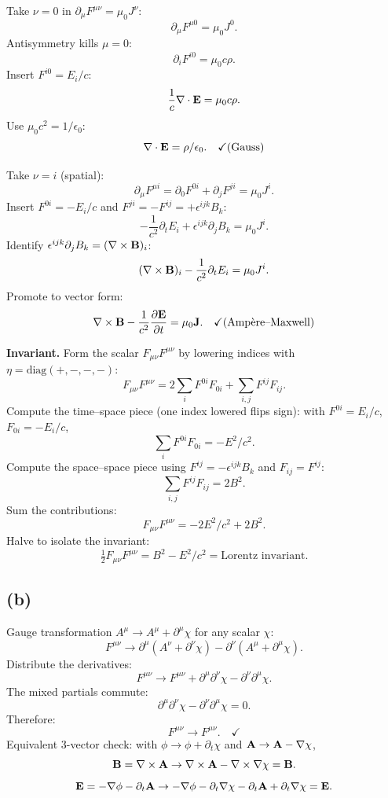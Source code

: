 \documentclass[11pt]{article}
\newcommand{\pd}[2]{\frac{\partial #1}{\partial #2}}
\begin{document}
Take $\nu=0$ in $\partial_\mu F^{\mu\nu}=\mu_0 J^\nu$:
\[ \partial_\mu F^{\mu 0} = \mu_0 J^0. \]
Antisymmetry kills $\mu=0$:
\[ \partial_i F^{i0} = \mu_0 c\rho. \]
Insert $F^{i0}=E_i/c$:
\[ \frac{1}{c}\nabla\cdot\vb E = \mu_0 c\rho. \]
Use $\mu_0 c^2 = 1/\epsilon_0$:
\[ \nabla\cdot\vb E = \rho/\epsilon_0. \quad\checkmark\text{(Gauss)} \]

Take $\nu=i$ (spatial):
\[ \partial_\mu F^{\mu i} = \partial_0 F^{0i}+\partial_j F^{ji} = \mu_0 J^i. \]
Insert $F^{0i}=-E_i/c$ and $F^{ji}=-F^{ij}=+\epsilon^{ijk}B_k$:
\[ -\frac{1}{c^2}\partial_t E_i + \epsilon^{ijk}\partial_j B_k = \mu_0 J^i. \]
Identify $\epsilon^{ijk}\partial_j B_k = (\nabla\times\vb B)_i$:
\[ (\nabla\times\vb B)_i - \frac{1}{c^2}\partial_t E_i = \mu_0 J^i. \]
Promote to vector form:
\[ \nabla\times\vb B - \frac{1}{c^2}\pd{\vb E}{t} = \mu_0\vb J. \quad\checkmark\text{(Amp\`ere--Maxwell)} \]

\textbf{Invariant.} Form the scalar $F_{\mu\nu}F^{\mu\nu}$ by lowering indices with $\eta = \mathrm{diag}(+,-,-,-)$:
\[ F_{\mu\nu}F^{\mu\nu} = 2\sum_i F^{0i}F_{0i} + \sum_{i,j} F^{ij}F_{ij}. \]
Compute the time--space piece (one index lowered flips sign): with $F^{0i}=E_i/c$, $F_{0i}=-E_i/c$,
\[ \sum_i F^{0i}F_{0i} = -E^2/c^2. \]
Compute the space--space piece using $F^{ij}=-\epsilon^{ijk}B_k$ and $F_{ij}=F^{ij}$:
\[ \sum_{i,j} F^{ij}F_{ij} = 2B^2. \]
Sum the contributions:
\[ F_{\mu\nu}F^{\mu\nu} = -2E^2/c^2 + 2B^2. \]
Halve to isolate the invariant:
\[ \boxed{\;\tfrac{1}{2}F_{\mu\nu}F^{\mu\nu} = B^2 - E^2/c^2 = \text{Lorentz invariant}.\;} \]

\subsection*{(b)}

Gauge transformation $A^\mu\to A^\mu+\partial^\mu\chi$ for any scalar $\chi$:
\[ F^{\mu\nu}\to \partial^\mu(A^\nu+\partial^\nu\chi)-\partial^\nu(A^\mu+\partial^\mu\chi). \]
Distribute the derivatives:
\[ F^{\mu\nu}\to F^{\mu\nu} + \partial^\mu\partial^\nu\chi - \partial^\nu\partial^\mu\chi. \]
The mixed partials commute:
\[ \partial^\mu\partial^\nu\chi - \partial^\nu\partial^\mu\chi = 0. \]
Therefore:
\[ F^{\mu\nu}\to F^{\mu\nu}. \quad\checkmark \]
Equivalent 3-vector check: with $\phi\to\phi+\partial_t\chi$ and $\vb A\to\vb A - \nabla\chi$,
\[ \vb B = \nabla\times\vb A \to \nabla\times\vb A - \nabla\times\nabla\chi = \vb B. \]
\[ \vb E = -\nabla\phi-\partial_t\vb A \to -\nabla\phi - \partial_t\nabla\chi - \partial_t\vb A + \partial_t\nabla\chi = \vb E. \]
\end{document}
